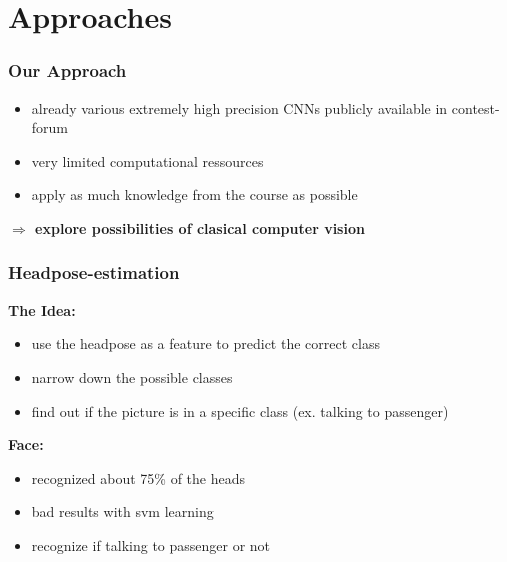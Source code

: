 \documentclass{beamer}
\begin{document}
	\section{Approaches}

    \begin{frame}
        \frametitle{Our Approach}
        \begin{itemize}
            \item already various extremely high precision CNNs publicly available in contest-forum
            \item very limited computational ressources
            \item apply as much knowledge from the course as possible
        \end{itemize}
        \vspace{1cm}
        \begin{centering}
           \Large \textbf{$\Rightarrow$ explore possibilities of clasical computer vision}
        \end{centering}
        
    \end{frame}

	\begin{frame}
		\frametitle{Headpose-estimation}
        \textbf{The Idea:}
		\begin{itemize}
			\item use the headpose as a feature to predict the correct class
			\item narrow down the possible classes
			\item find out if the picture is in a specific class (ex. talking to passenger)
		\end{itemize}
        \textbf{Face:}
		\begin{itemize}
			\item recognized about 75\% of the heads
			\item bad results with svm learning
			\item recognize if talking to passenger or not
		\end{itemize}
	\end{frame}
	
\end{document}
